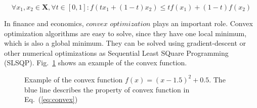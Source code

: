 \documentclass[12pt]{article}
\begin{document}
\begin{itemize}
\begin{equation}
\label{eq:convex}
\forall x_1,x_2 \in \mathbf{X}, \forall t \in [0,1]: f(tx_1+(1-t)x_2) \leq tf(x_1)+(1-t)f(x_2 )
\end{equation}

In finance and economics, $convex$ $optimization$ plays an important role. Convex optimization algorithms are easy to solve, since they have one local minimum, which is also a global minimum. They can be solved using gradient-descent or other numerical optimizations as Sequential Least SQuare Programming (SLSQP). Fig.~\ref{fig:convex} shows an example of the convex function.

\begin{figure}[!htbp]
\begin{center}
\caption{Example of the convex function $f(x)=(x-1.5)^2+0.5$. The blue line describes the property of convex function in Eq.~(\ref{eq:convex})}
\label{fig:convex}
\end{center}
\end{figure}


\end{itemize}
\end{document}
